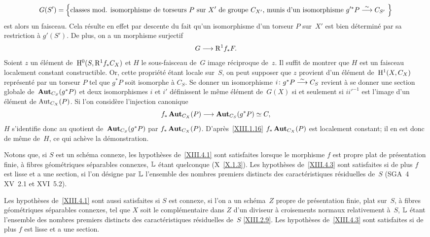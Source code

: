 $$
G(S') = \left\{\text{classes mod. isomorphisme de
		torseurs $P$ sur~$X'$ de groupe $C_{X'}$, munis d'un
		isomorphisme $g'^*P\overset{\sim}{\longrightarrow} C_{S'}$ } \right\}
$$
est alors un faisceau. Cela r\'esulte en effet par descente du fait
qu'un isomorphisme d'un torseur $P$ sur~$X'$ est bien
d\'etermin\'e par sa restriction \`a $g'(S')$. De plus, on a un
morphisme surjectif
$$
G\to \R^1f_*F.
$$
Soient $z$ un \'el\'ement de~$\mathrm{H}^0(S,\mathrm{R}^1f_*C_X)$ et $H$ le
sous-faisceau de~$G$ image r\'eciproque de~$z$. Il suffit de montrer
que $H$ est un faisceau localement constant constructible. Or, cette
propri\'et\'e \'etant locale sur~$S$, on peut supposer que $z$
provient d'un \'el\'ement de~$\mathrm{H}^1(X,C_X)$ repr\'esent\'e par
un torseur $P$ tel que $g^*P$ soit isomorphe \`a $C_S$. Se donner un
isomorphisme $i\colon g^*P\overset{\sim}{\longrightarrow} C_S$ revient \`a se donner une
section globale de~$\operatorname{\mathbf{Aut}}_{C_S}(g^*P)$ et deux isomorphismes $i$
et $i'$ d\'efinissent le m\^eme \'el\'ement de~$G(X)$ si et
seulement si $ii'^{-1}$ est l'image d'un \'el\'ement de
$\operatorname{Aut}_{C_X}(P)$. Si l'on consid\`ere l'injection canonique
$$
f_*\SheafAut_{C_X}(P)\to\SheafAut_{C_S}(g^*P)\simeq C,
$$
$H$ s'identifie donc au quotient de~$\operatorname{\mathbf{Aut}}_{C_S}(g^*P)$ par
$f_*\operatorname{\mathbf{Aut}}_{C_X}(P)$. D'apr\`es~\ref{XIII.1.16}
$f_*\operatorname{\mathbf{Aut}}_{C_X}(P)$ est localement constant; il en est donc de
m\^eme de~$H$, ce qui ach\`eve la d\'emonstration.

\begin{exemples}
\label{XIII.4.4}
Notons que, si $S$ est un sch\'ema connexe, les hypoth\`eses
de~\ref{XIII.4.1} sont satisfaites lorsque le morphisme $f$ est propre
plat de pr\'esentation finie, \`a fibres g\'eom\'etriques
s\'eparables connexes, $\mathbb{L}$ \'etant quelconque
(\cf X~\ref{X.1.3}). Les hypoth\`eses de~\ref{XIII.4.3} sont
satisfaites si de plus $f$ est lisse et a une section, si l'on
d\'esigne par $\mathbb{L}$ l'ensemble des nombres premiers distincts des
caract\'eristiques r\'esiduelles de~$S$ (SGA~4 XV~2.1 et XVI~5.2).

Les hypoth\`eses de~\ref{XIII.4.1} sont aussi satisfaites si $S$ est connexe,
si l'on a un sch\'ema~$Z$ propre de pr\'esentation finie, plat sur~$S$, \`a
fibres g\'eom\'etriques s\'eparables connexes, tel que $X$ soit
le compl\'ementaire dans $Z$ d'un diviseur \`a croisements normaux
relativement \`a~$S$, $\mathbb{L}$ \'etant l'ensemble des nombres
premiers distincts des caract\'eristiques r\'esiduelles de~$S$
\eqref{XIII.2.9}. Les hypoth\`eses de~\ref{XIII.4.3} sont
satisfaites si de plus $f$ est lisse et a une section.
\end{exemples}

